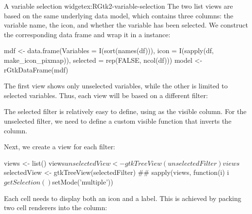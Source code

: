 \begin{example}{A variable selection widget}{ex:RGtk2-variable-selection}
The two list views are based on the same underlying data model, which
contains three columns: the variable name, the icon, and whether the
variable has been selected. We construct the corresponding data frame
and wrap it in a  instance:
\begin{Schunk}
\begin{Sinput}
 mdf <- data.frame(Variables = I(sort(names(df))),
                   icon = I(sapply(df, make_icon_pixmap)),
                   selected = rep(FALSE, ncol(df)))
 model <- rGtkDataFrame(mdf)
\end{Sinput}
\end{Schunk}

The first view shows only unselected variables, while the other is
limited to selected variables. Thus, each view will be based on a
different filter:
\begin{Schunk}
\end{Schunk}
%
The selected filter is relatively easy to define, using
 as the visible column. For the unselected filter, we
need to define a custom visible function that inverts the
 column.

Next, we create a view for each filter:
\begin{Schunk}
\begin{Sinput}
 views <- list()
 views$unselectedView <- gtkTreeView(unselectedFilter)
 views$selectedView <- gtkTreeView(selectedFilter)
 ##
 sapply(views, function(i) i$getSelection()$setMode('multiple'))
\end{Sinput}
\end{Schunk}

Each cell needs to display both an icon and a label.  This is achieved
by packing two cell renderers into the column:
\begin{Schunk}
\end{Schunk}


\end{example}
